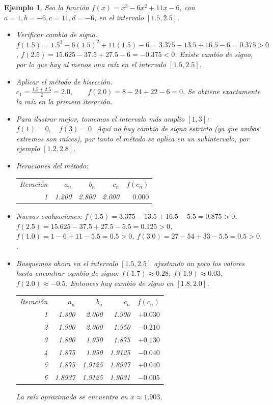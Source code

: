 \documentclass[12pt]{article}
\newtheorem{Ejem}{Ejemplo}%
\begin{document}
\begin{Ejem} Sea la funci\'on $f(x) = x^3 - 6x^2 + 11x - 6$, con $a=1, b=-6,c=11,d=-6$, en el intervalo $[1.5,2.5]$.
\begin{itemize}


\item Verificar cambio de signo.
$f(1.5) = 1.5^3 - 6(1.5)^2 + 11(1.5) - 6 = 3.375 - 13.5 + 16.5 - 6 = 0.375 > 0$, $f(2.5) = 15.625 - 37.5 + 27.5 - 6 = -0.375 < 0$. Existe cambio de signo, por lo que hay al menos una raíz en el intervalo $[1.5,2.5]$.

\item Aplicar el método de bisección. $c_1 = \frac{1.5+2.5}{2} = 2.0, \qquad f(2.0) = 8 - 24 + 22 - 6 = 0$. Se obtiene exactamente la raíz en la primera iteración.

\item Para ilustrar mejor, tomemos el intervalo más amplio $[1,3]$: $f(1) = 0, \quad f(3) = 0$. Aquí no hay cambio de signo estricto (ya que ambos extremos son raíces), por tanto el método se aplica en un subintervalo, por ejemplo $[1.2, 2.8]$.

\item Iteraciones del método:

\begin{center}
\begin{tabular}{@{}rrrrr@{}}
Iteración & $a_n$ & $b_n$ & $c_n$ & $f(c_n)$ \\
1 & 1.200 & 2.800 & 2.000 & $0.000$ \\
\end{tabular}
\end{center}

\item Nuevas evaluaciones:
$f(1.5) = 3.375 - 13.5 + 16.5 - 5.5 = 0.875 > 0$, $f(2.5) = 15.625 - 37.5 + 27.5 - 5.5 = 0.125 > 0$, $f(1.0) = 1 - 6 + 11 - 5.5 = 0.5 > 0$, $f(3.0) = 27 - 54 + 33 - 5.5 = 0.5 > 0$.

\item Busquemos ahora en el intervalo $[1.5, 2.5]$ ajustando un poco los valores hasta encontrar cambio de signo: $f(1.7) \approx 0.28$, $f(1.9) \approx 0.03$, $f(2.0) \approx -0.5$. Entonces hay cambio de signo en $[1.8, 2.0]$.

\begin{center}
\begin{tabular}{@{}rrrrr@{}}
Iteración & $a_n$ & $b_n$ & $c_n$ & $f(c_n)$ \\
1 & 1.800 & 2.000 & 1.900 & $+0.030$ \\
2 & 1.900 & 2.000 & 1.950 & $-0.210$ \\
3 & 1.800 & 1.950 & 1.875 & $+0.130$ \\
4 & 1.875 & 1.950 & 1.9125 & $-0.040$ \\
5 & 1.875 & 1.9125 & 1.8937 & $+0.040$ \\
6 & 1.8937 & 1.9125 & 1.9031 & $-0.005$ \\
\end{tabular}
\end{center}

La raíz aproximada se encuentra en $x \approx 1.903$.
\end{itemize}
\end{Ejem}
\end{document}
